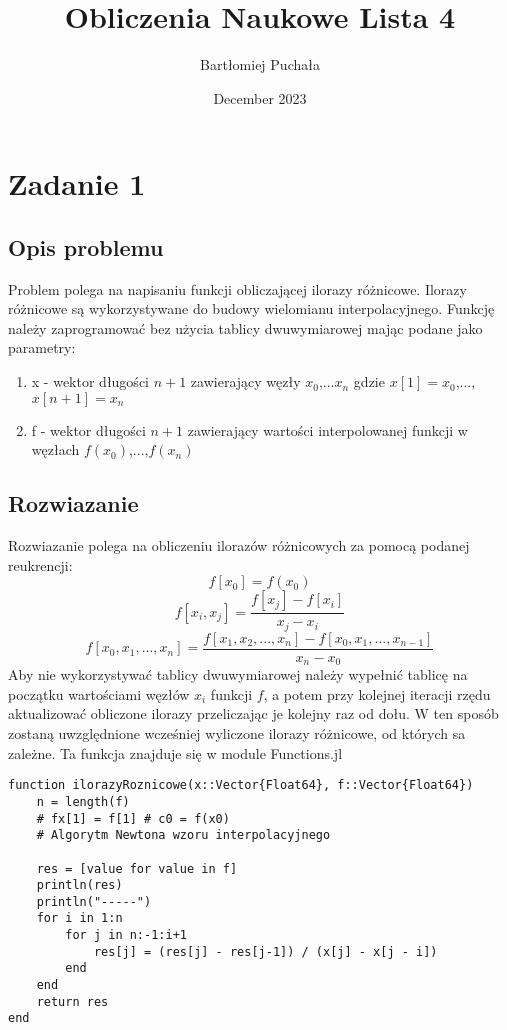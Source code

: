 \documentclass{article}
\title{Obliczenia Naukowe Lista 4}
\author{Bartłomiej Puchała}
\date{December 2023}
\begin{document}
\maketitle

\section{Zadanie 1}
\subsection{Opis problemu}
Problem polega na napisaniu funkcji obliczającej ilorazy różnicowe. Ilorazy różnicowe są wykorzystywane do budowy wielomianu interpolacyjnego. Funkcję należy zaprogramować bez użycia tablicy dwuwymiarowej mając podane jako parametry:
\begin{center}

\begin{enumerate}
    \item x - wektor długości $n + 1$ zawierający węzły $x_0$,...$x_n$ gdzie $x[1] = x_0$,...,$x[n+1] = x_n$
    \item f - wektor długości $n + 1$ zawierający wartości interpolowanej funkcji w węzłach $f(x_0)$,...,$f(x_n)$
\end{enumerate}

\end{center}
\subsection{Rozwiazanie}
Rozwiazanie polega na obliczeniu ilorazów różnicowych za pomocą podanej reukrencji:
$$f[x_0] = f(x_0)$$
$$f[x_i, x_j] = \frac{f[x_j] - f[x_i]}{x_j - x_i}$$
$$ f[x_0, x_1, ..., x_n] = \frac{f[x_1, x_2, ..., x_n] - f[x_0, x_1, ..., x_{n-1}]}{x_n - x_0} $$
Aby nie wykorzystywać tablicy dwuwymiarowej należy wypełnić tablicę na początku wartościami węzłów $x_i$ funkcji $f$, a potem przy kolejnej iteracji rzędu aktualizować obliczone ilorazy przeliczając je kolejny raz od dołu. W ten sposób zostaną uwzględnione wcześniej wyliczone ilorazy różnicowe, od których sa zależne.
\newpage
Ta funkcja znajduje się w module Functions.jl
\vspace{10pt}
\begin{verbatim}
function ilorazyRoznicowe(x::Vector{Float64}, f::Vector{Float64})
    n = length(f)
    # fx[1] = f[1] # c0 = f(x0)
    # Algorytm Newtona wzoru interpolacyjnego

    res = [value for value in f]
    println(res)
    println("-----")
    for i in 1:n
        for j in n:-1:i+1
            res[j] = (res[j] - res[j-1]) / (x[j] - x[j - i])
        end
    end
    return res
end
\end{verbatim}
\end{document}
